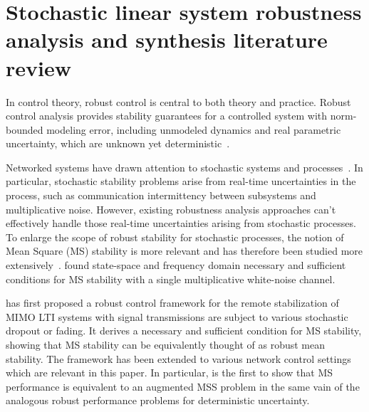 %
%
 



\section{Stochastic linear system robustness analysis and synthesis literature review}

In control theory, robust control is central to both theory and practice. 
Robust control analysis provides stability guarantees for a controlled system with norm-bounded modeling error, including unmodeled dynamics and real parametric uncertainty, which are unknown yet deterministic~\cite{Zhou1996RobustControl, Doyle1987UncertainSS, Packard1990QuadStab, Gahinet1994LMIHinf,packard_mainloop}.

Networked systems have drawn attention to stochastic systems and processes~\cite{IntroStoc}. In particular, stochastic stability problems arise from real-time uncertainties in the process, such as communication intermittency between subsystems and multiplicative noise. However, existing robustness analysis approaches can't effectively handle those real-time uncertainties arising from stochastic processes. To enlarge the scope of robust stability for stochastic processes, the notion of Mean Square (MS) stability is more relevant and has therefore been studied more extensively~\cite{IntroStoc, Willems1973MSstability, Willems1971FreqMSS, Elia2005stabfading}.
\cite{Willems1971FreqMSS, Willems1973MSstability} found state-space and frequency domain necessary and sufficient conditions for MS stability with a single multiplicative white-noise channel.


\cite{Elia2005stabfading} has first proposed a robust control framework for the remote stabilization of MIMO LTI systems with signal transmissions are subject to various stochastic dropout or fading. It derives a necessary and sufficient condition for MS stability, showing that MS stability can be equivalently thought of as robust mean stability. The framework has been extended to various network control settings \cite{Padma2006tradeoffs, Padma06ACC, Jeff11, MattACC15, Matt2017thesis} which are relevant in this paper. In particular, \cite{Ma2015} is the first to show that MS performance is equivalent to an augmented MSS problem in the same vain of the analogous robust performance problems for deterministic uncertainty. 

